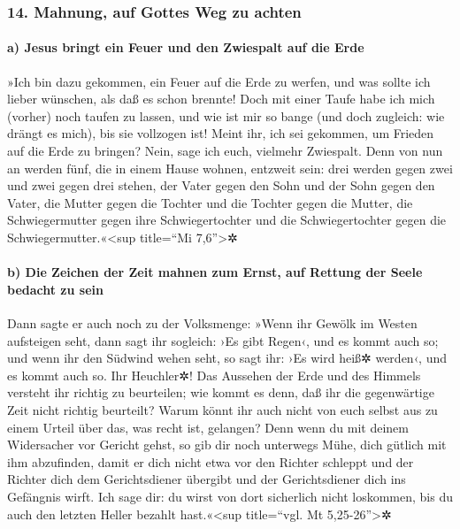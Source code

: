 \hypertarget{mahnung-auf-gottes-weg-zu-achten}{%
\subsubsection{14. Mahnung, auf Gottes Weg zu
achten}\label{mahnung-auf-gottes-weg-zu-achten}}

\hypertarget{a-jesus-bringt-ein-feuer-und-den-zwiespalt-auf-die-erde}{%
\paragraph{a) Jesus bringt ein Feuer und den Zwiespalt auf die
Erde}\label{a-jesus-bringt-ein-feuer-und-den-zwiespalt-auf-die-erde}}

 »Ich bin dazu gekommen, ein Feuer auf die Erde zu
werfen, und was sollte ich lieber wünschen, als daß es schon brennte!
 Doch mit einer Taufe habe ich mich (vorher) noch taufen
zu lassen, und wie ist mir so bange (und doch zugleich: wie drängt es
mich), bis sie vollzogen ist!  Meint ihr, ich sei
gekommen, um Frieden auf die Erde zu bringen? Nein, sage ich euch,
vielmehr Zwiespalt.  Denn von nun an werden fünf, die in
einem Hause wohnen, entzweit sein: drei werden gegen zwei und zwei gegen
drei stehen,  der Vater gegen den Sohn und der Sohn gegen
den Vater, die Mutter gegen die Tochter und die Tochter gegen die
Mutter, die Schwiegermutter gegen ihre Schwiegertochter und die
Schwiegertochter gegen die Schwiegermutter.«\textless sup title=``Mi
7,6''\textgreater✲

\hypertarget{b-die-zeichen-der-zeit-mahnen-zum-ernst-auf-rettung-der-seele-bedacht-zu-sein}{%
\paragraph{b) Die Zeichen der Zeit mahnen zum Ernst, auf Rettung der
Seele bedacht zu
sein}\label{b-die-zeichen-der-zeit-mahnen-zum-ernst-auf-rettung-der-seele-bedacht-zu-sein}}

 Dann sagte er auch noch zu der Volksmenge: »Wenn ihr
Gewölk im Westen aufsteigen seht, dann sagt ihr sogleich: ›Es gibt
Regen‹, und es kommt auch so;  und wenn ihr den Südwind
wehen seht, so sagt ihr: ›Es wird heiß✲ werden‹, und es kommt auch so.
 Ihr Heuchler✲! Das Aussehen der Erde und des Himmels
versteht ihr richtig zu beurteilen; wie kommt es denn, daß ihr die
gegenwärtige Zeit nicht richtig beurteilt?  Warum könnt
ihr auch nicht von euch selbst aus zu einem Urteil über das, was recht
ist, gelangen?  Denn wenn du mit deinem Widersacher vor
Gericht gehst, so gib dir noch unterwegs Mühe, dich gütlich mit ihm
abzufinden, damit er dich nicht etwa vor den Richter schleppt und der
Richter dich dem Gerichtsdiener übergibt und der Gerichtsdiener dich ins
Gefängnis wirft.  Ich sage dir: du wirst von dort
sicherlich nicht loskommen, bis du auch den letzten Heller bezahlt
hast.«\textless sup title=``vgl. Mt 5,25-26''\textgreater✲

